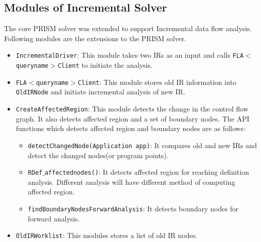 \documentclass[11pt,a4paper,openright]{report}
\begin{document}
\subsection{Modules of Incremental Solver}
The core PRISM solver was extended to support Incremental data flow analysis. Following modules are the extensions to the PRISM solver.
\begin{itemize}
 \item \texttt{IncrementalDriver}: This module takes two IRs as an input and calls \texttt{FLA$<$queryname$>$Client} to initiate the analysis.
 \item \texttt{FLA$<$queryname$>$Client}: This module stores old IR information into \texttt{OldIRNode} and initiate incremental analysis of new IR.
 \item \texttt{CreateAffectedRegion}: This module detects the change in the control flow graph. It also detects affected region and a set of boundary nodes.
 The API functions which detects affected region and boundary nodes are as follows:
 \begin{itemize}
  \item \texttt{detectChangedNode(Application app)}: It compares old and new IRs and detect the changed nodes(or program points).
  \item \texttt{RDef$\_$affectednodes()}: It detects affected region for reaching definition analysis. Different analysis will have different method of computing affected region. 
  \item \texttt{findBoundaryNodesForwardAnalysis}: It detects boundary nodes for forward analysis. 
   \end{itemize}
 \item \texttt{OldIRWorklist}: This modules stores a list of old IR nodes.
\end{itemize}

% 
\end{document}
